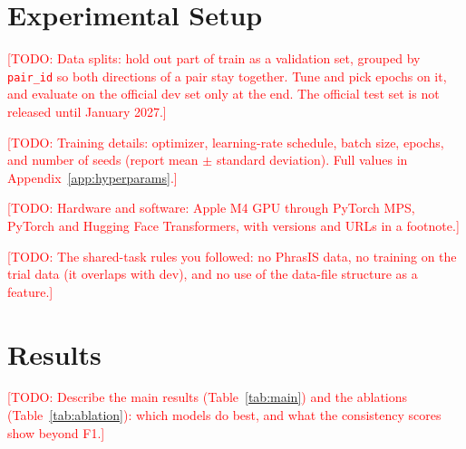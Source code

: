 \documentclass[11pt]{article}
\newcommand{\todo}[1]{\textcolor{red}{[TODO: #1]}}
\begin{document}
\section{Experimental Setup}

\todo{Data splits: hold out part of train as a validation set, grouped by \texttt{pair\_id} so both directions of a pair stay together. Tune and pick epochs on it, and evaluate on the official dev set only at the end. The official test set is not released until January 2027.}

\todo{Training details: optimizer, learning-rate schedule, batch size, epochs, and number of seeds (report mean $\pm$ standard deviation). Full values in Appendix~\ref{app:hyperparams}.}

\todo{Hardware and software: Apple M4 GPU through PyTorch MPS, PyTorch and Hugging Face Transformers, with versions and URLs in a footnote.}

\todo{The shared-task rules you followed: no PhrasIS data, no training on the trial data (it overlaps with dev), and no use of the data-file structure as a feature.}

\section{Results}

\todo{Describe the main results (Table~\ref{tab:main}) and the ablations (Table~\ref{tab:ablation}): which models do best, and what the consistency scores show beyond F1.}
\end{document}
